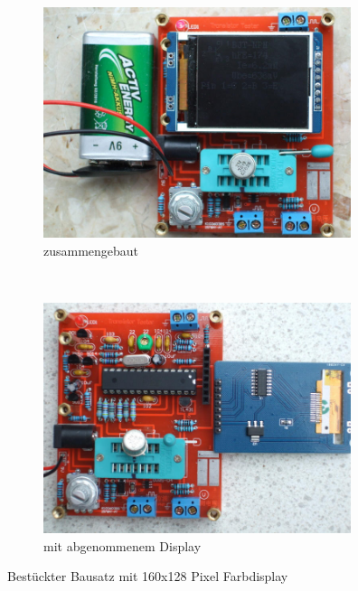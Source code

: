 \begin{figure}[H]
  \begin{subfigure}[b]{9cm}
    \centering
    \includegraphics[width=9cm]{../PNG/Kit_Color_a.jpg}
    \caption{zusammengebaut}
  \end{subfigure}
  ~
  \begin{subfigure}[b]{9cm}
    \centering
    \includegraphics[width=9cm]{../PNG/Kit_Color_b.jpg}
    \caption{mit abgenommenem Display}
  \end{subfigure}
  \caption{Bestückter Bausatz mit 160x128 Pixel Farbdisplay}
  \label{fig:Kit_color}
\end{figure}

